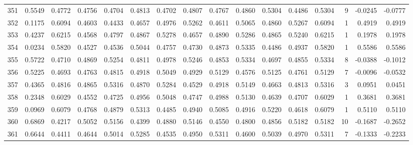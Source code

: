 \begin{tabular}{lrrrrrrrrrrrrrrr}
351 &      0.5549 &  0.4772 &  0.4756 &  0.4704 &  0.4813 &  0.4702 &  0.4807 &  0.4767 &  0.4860 &  0.5304 &   0.4486 &     0.5304 &      9 &                   -0.0245 &                    -0.0777 \\
352 &      0.1175 &  0.6094 &  0.4603 &  0.4433 &  0.4657 &  0.4976 &  0.5262 &  0.4611 &  0.5065 &  0.4860 &   0.5267 &     0.6094 &      1 &                    0.4919 &                     0.4919 \\
353 &      0.4237 &  0.6215 &  0.4568 &  0.4797 &  0.4867 &  0.5278 &  0.4657 &  0.4890 &  0.5286 &  0.4865 &   0.5240 &     0.6215 &      1 &                    0.1978 &                     0.1978 \\
354 &      0.0234 &  0.5820 &  0.4527 &  0.4536 &  0.5044 &  0.4757 &  0.4730 &  0.4873 &  0.5335 &  0.4486 &   0.4937 &     0.5820 &      1 &                    0.5586 &                     0.5586 \\
355 &      0.5722 &  0.4710 &  0.4869 &  0.5254 &  0.4811 &  0.4978 &  0.5246 &  0.4853 &  0.5334 &  0.4697 &   0.4855 &     0.5334 &      8 &                   -0.0388 &                    -0.1012 \\
356 &      0.5225 &  0.4693 &  0.4763 &  0.4815 &  0.4918 &  0.5049 &  0.4929 &  0.5129 &  0.4576 &  0.5125 &   0.4761 &     0.5129 &      7 &                   -0.0096 &                    -0.0532 \\
357 &      0.4365 &  0.4816 &  0.4865 &  0.5316 &  0.4870 &  0.5284 &  0.4529 &  0.4918 &  0.5149 &  0.4663 &   0.4813 &     0.5316 &      3 &                    0.0951 &                     0.0451 \\
358 &      0.2348 &  0.6029 &  0.4552 &  0.4725 &  0.4956 &  0.5048 &  0.4747 &  0.4988 &  0.5130 &  0.4639 &   0.4707 &     0.6029 &      1 &                    0.3681 &                     0.3681 \\
359 &      0.0969 &  0.6079 &  0.4768 &  0.4879 &  0.5313 &  0.4485 &  0.4940 &  0.5085 &  0.4916 &  0.5220 &   0.4618 &     0.6079 &      1 &                    0.5110 &                     0.5110 \\
360 &      0.6869 &  0.4217 &  0.5052 &  0.5156 &  0.4399 &  0.4880 &  0.5146 &  0.4550 &  0.4800 &  0.4856 &   0.5182 &     0.5182 &     10 &                   -0.1687 &                    -0.2652 \\
361 &      0.6644 &  0.4411 &  0.4644 &  0.5014 &  0.5285 &  0.4535 &  0.4950 &  0.5311 &  0.4600 &  0.5039 &   0.4970 &     0.5311 &      7 &                   -0.1333 &                    -0.2233 \\

\end{tabular}

